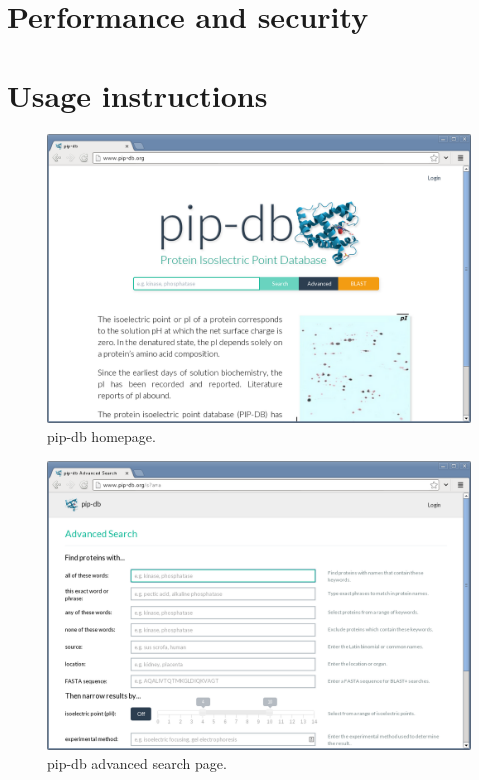 \section{Performance and security}

\section{Usage instructions}


\begin{figure}[H]
\centering
    \includegraphics[width=\textwidth]{assets/pip-db}
\caption[pip-db homepage]
        {pip-db homepage.}
\label{fig:pip-db}
\end{figure}


\begin{figure}[H]
\centering
    \includegraphics[width=\textwidth]{assets/pip-db-advanced}
\caption[pip-db advanced search page]
        {pip-db advanced search page.}
\label{fig:pip-db-advanced}
\end{figure}


